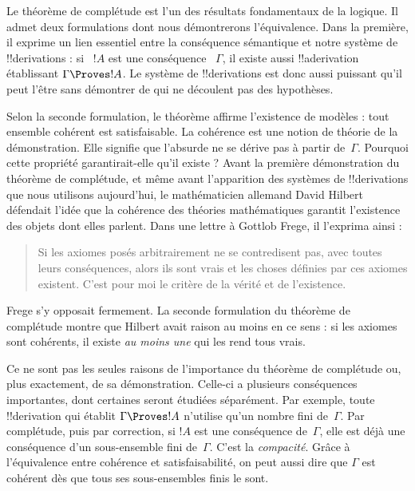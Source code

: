 \documentclass[../../../include/open-logic-section]{subfiles}
\begin{document}
      {}
      {}


Le théorème de complétude est l'un des résultats fondamentaux de la
logique. Il admet deux formulations dont nous démontrerons
l'équivalence. Dans la première, il exprime un lien essentiel entre
la conséquence sémantique et notre système de !!{derivation}s : si
~$!A$ est une conséquence ~$\Gamma$,
il existe aussi !!a{derivation} établissant
$\Gamma\Proves !A$. Le système de !!{derivation}s est donc aussi
puissant qu'il peut l'être sans démontrer de  qui ne découlent
pas des hypothèses.

Selon la seconde formulation, le théorème affirme l'existence de
modèles : tout ensemble cohérent  est satisfaisable.
La cohérence est une notion de théorie de la démonstration.
Elle signifie que l'absurde ne se dérive pas à partir de~$\Gamma$.
Pourquoi cette propriété garantirait-elle qu'il existe
 ? Avant la première démonstration du théorème
de complétude, et même avant l'apparition des systèmes de
!!{derivation}s que nous utilisons aujourd'hui, le mathématicien
allemand David Hilbert défendait l'idée que la cohérence des théories
mathématiques garantit l'existence des objets dont elles parlent.
Dans une lettre à Gottlob Frege, il l'exprima ainsi :
\begin{quote}
  Si les axiomes posés arbitrairement ne se contredisent pas, avec
  toutes leurs conséquences, alors ils sont vrais et les choses
  définies par ces axiomes existent. C'est pour moi le critère de la
  vérité et de l'existence.
\end{quote}
Frege s'y opposait fermement. La seconde formulation du théorème de
complétude montre que Hilbert avait raison au moins en ce sens : si
les axiomes sont cohérents, il existe \emph{au moins une}
 qui les rend tous vrais.

Ce ne sont pas les seules raisons de l'importance du théorème de
complétude ou, plus exactement, de sa démonstration. Celle-ci a
plusieurs conséquences importantes, dont certaines seront étudiées
séparément. Par exemple, toute !!{derivation} qui établit
$\Gamma\Proves !A$ n'utilise qu'un nombre fini 
de~$\Gamma$. Par complétude, puis par correction,
si $!A$ est une conséquence de~$\Gamma$, elle est déjà une
conséquence d'un sous-ensemble fini de~$\Gamma$. C'est la
\emph{compacité}. Grâce à l'équivalence entre cohérence et
satisfaisabilité, on peut aussi dire que $\Gamma$ est cohérent
dès que tous ses sous-ensembles finis le sont.
\end{document}
